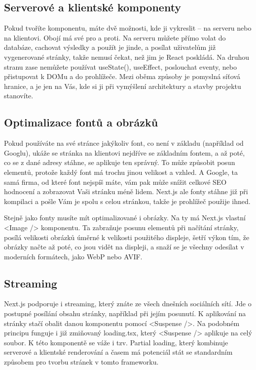 \subsection*{Serverové a klientské komponenty}

Pokud tvoříte komponentu, máte dvě možnosti, kde ji vykreslit\cite{NextJSS&CComponents} – na serveru\cite{NextJSServerComponents} nebo na klientovi\cite{NextJSClientComponents}. Obojí má své pro a proti. Na serveru můžete přímo volat do databáze, cachovat výsledky a použít je jinde, a posílat uživatelům již vygenerované stránky, takže nemusí čekat, než jim je React poskládá. Na druhou stranu zase nemůžete používat useState(), useEffect, poslouchat eventy, nebo přistupovat k DOMu a do prohlížeče. Mezi oběma způsoby je pomyslná síťová hranice, a je jen na Vás, kde si ji při vymýšlení architektury a stavby projektu stanovíte.

\subsection*{Optimalizace fontů a obrázků}

Pokud používáte na své stránce jakýkoliv font, co není v základu (například od Googlu), ukáže se stránka na klientovi nejdříve se základním fontem, a až poté, co se z dané adresy stáhne, se aplikuje ten správný. To může způsobit posun elementů, protože každý font má trochu jinou velikost a vzhled. A Google, ta samá firma, od které font nejspíš máte, vám pak může snížit celkové SEO hodnocení a zobrazovat Vaši stránku méně lidem. Next.js ale fonty stáhne již při kompilaci a pošle Vám je spolu s celou stránkou, takže je prohlížeč použije ihned.

Stejně jako fonty musíte mít optimalizované i obrázky. Na ty má Next.js vlastní <Image /> komponentu. Ta zabraňuje posunu elementů při načítání stránky, posílá velikosti obrázků úměrné k velikosti použitého displeje, šetří výkon tím, že obrázky načte až poté, co jsou vidět na displeji, a snaží se je všechny odesílat v moderních formátech, jako WebP nebo AVIF.

\subsection*{Streaming}

Next.js podporuje i streaming, který znáte ze všech dnešních sociálních sítí. Jde o postupné posílání obsahu stránky, například při jejím posunutí. K aplikování na stránky stačí obalit danou komponentu pomocí <Suspense />. Na podobném principu funguje i již zmiňovaný loading.tsx, který <Suspense /> aplikuje na celý soubor. K této komponentě se váže i tzv. Partial loading, který kombinuje serverové a klientské renderování a časem má potenciál stát se standardním způsobem pro tvorbu stránek v tomto frameworku.

